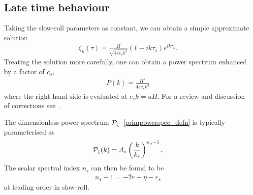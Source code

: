     \subsection{Late time behaviour}




    Taking the slow-roll parameters as constant, we can obtain a simple approximate solution
    \begin{align}\label{uk_solution}
        \zeta_k(\tau) = \frac{H}{\sqrt{4\varepsilon c_s k^3}}\left(1-ik\tau_s\right)e^{i k\tau_s}.
    \end{align}
    Treating the solution more carefully, one can obtain
    a power spectrum enhanced by a factor of $c_s$,
    \begin{align}
        P(k) = \frac{H^2}{4\varepsilon c_s k^3}
    \end{align}
    where the right-hand side is evaluated at $c_sk=aH$.
    For a review and discussion of corrections see~\cite{px_burrage}.


The dimensionless power spectrum $\mathcal{P}_{\mathcal{\zeta}}$~\eqref{primpowerspec_defn}
is typically parameterised as
\begin{align}
    \mathcal{P}_{\mathcal{\zeta}}(k) = A_s \left(\frac{k}{k_*}\right)^{n_s-1}.
\end{align}
The scalar spectral index $n_s$ can then be found to be
\begin{align}
n_s-1 = -2\varepsilon-\eta-\varepsilon_s
\end{align}
at leading order in slow-roll.



